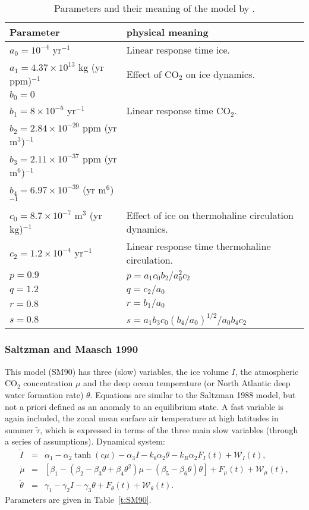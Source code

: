 \documentclass[12pt]{article}
\def\ba{\begin{eqnarray}}
\def\ea{\end{eqnarray}}
\begin{document}
\begin{table}[h!]
\begin{tabular}{ll}
\hline
Parameter & physical meaning \\
\hline
$a_0 = 10^{-4}$ yr$^{-1}$ & Linear response time ice.\\
$a_1 = 4.37\times10^{13}$ kg (yr ppm)$^{-1}$ & Effect of CO$_2$ on ice dynamics.\\
$b_0 = 0$ & \\
$b_1 = 8\times10^{-5}$ yr$^{-1}$ & Linear response time CO$_2$.\\
$b_2 = 2.84\times10^{-20}$ ppm (yr m$^3$)$^{-1}$ & \\
$b_3 = 2.11\times10^{-37}$ ppm (yr m$^6$)$^{-1}$ & \\
$b_4 = 6.97\times10^{-39}$ (yr m$^6$)$^{-1}$ & \\
$c_0 = 8.7\times10^{-7}$ m$^3$ (yr kg)$^{-1}$ & Effect of ice on thermohaline circulation dynamics. \\
$c_2 = 1.2\times10^{-4}$ yr$^{-1}$ & Linear response time thermohaline circulation.\\
\hline
$p = 0.9$ & $p = a_1c_0b_2/a_0^2c_2$\\
$q = 1.2$ & $q=c_2/a_0$\\
$r = 0.8$ & $r=b_1/a_0$\\
$s = 0.8$ & $s=a_1b_3c_0(b_4/a_0)^{1/2}/a_0b_4c_2$\\
\hline
\end{tabular}
\label{t:SM88}
\caption{Parameters and their meaning of the model by \cite{Saltzman:1988tv}. }
\end{table}


\subsubsection{Saltzman and Maasch 1990}
This model \cite{Saltzman:1990uy} (SM90) has three (slow) variables, the ice volume $I$, the atmospheric CO$_2$ concentration $\mu$ and the deep ocean temperature (or North Atlantic deep water formation rate) $\theta$. Equations are similar to the Saltzman 1988 model, but not a priori defined as an anomaly to an equilibrium state. A fast variable is again included, the zonal mean surface air temperature at high latitudes in summer $\tilde \tau$, which is expressed in terms of the three main slow variables (through a series of assumptions). 
Dynamical system:
\ba
\dot I &=& \alpha_1 - \alpha_2 \tanh(c\mu) - \alpha_3 I - k_{\theta}\alpha_2\theta - k_R\alpha_2 F_I(t)+\mathcal{W}_I(t),\\
\dot \mu &=& [\beta_1 -(\beta_2 - \beta_3 \theta + \beta_4 \theta^2)\mu - (\beta_5 -\beta_6\theta)\theta] + F_\mu(t) +\mathcal{W}_{\mu}(t),\\
\dot \theta &=& \gamma_1 -\gamma_2 I - \gamma_3 \theta + F_{\theta}(t) + \mathcal{W}_{\theta}(t).
\label{e:SM90full}
\ea
Parameters are given in Table~\ref{t:SM90}. 
\end{document}

